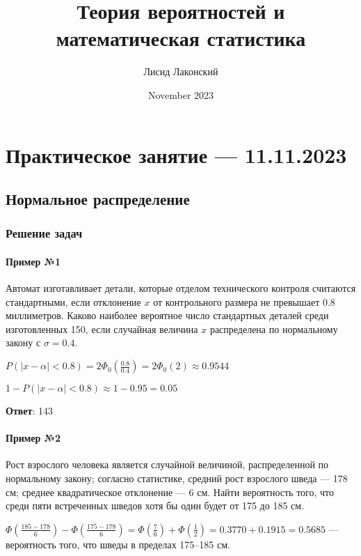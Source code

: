 \documentclass{article}
\title{Теория вероятностей и математическая статистика}
\author{Лисид Лаконский}
\date{November 2023}
\begin{document}
\raggedright

\maketitle

\tableofcontents
\pagebreak

\section{Практическое занятие — 11.11.2023}

\subsection{Нормальное распределение}

\subsubsection{Решение задач}

\paragraph{Пример №1}

Автомат изготавливает детали, которые отделом технического контроля считаются стандартными, если отклонение $x$ от контрольного размера не превышает $0.8$ миллиметров. Каково наиболее вероятное число стандартных деталей среди изготовленных 150, если случайная величина $x$ распределена по нормальному закону с $\sigma = 0.4$.

$P(|x - \alpha| < 0.8) = 2 \Phi_0 (\frac{0.8}{0.4}) = 2 \Phi_0(2) \approx 0.9544$

$1 - P(|x - \alpha| < 0.8) \approx 1 -0.95 = 0.05$

\textbf{Ответ}: 143

\paragraph{Пример №2}

Рост взрослого человека является случайной величиной, распределенной по нормальному закону; согласно статистике, средний рост взрослого шведа — 178 см; среднее квадратическое отклонение — 6 см. Найти вероятность того, что среди пяти встреченных шведов хотя бы один будет от 175 до 185 см.

$\Phi (\frac{185 - 178}{6}) - \Phi (\frac{175 - 178}{6}) = \Phi (\frac{7}{6}) + \Phi (\frac{1}{2}) = 0.3770 + 0.1915 = 0.5685$ — вероятность того, что шведы в пределах 175–185 см.
\end{document}
